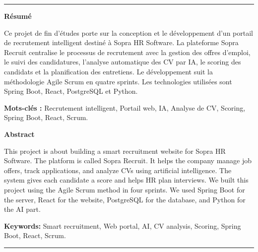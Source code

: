 ﻿\thispagestyle{empty}
\vspace*{2cm}

\begin{center}
\rule{0.8\textwidth}{0.4pt}
\vspace{0.6cm}

{\Large\bfseries Résumé}
\vspace{0.4cm}
\end{center}

\noindent Ce projet de fin d'études porte sur la conception et le développement d'un portail de recrutement intelligent destiné à Sopra HR Software. La plateforme Sopra Recruit centralise le processus de recrutement avec la gestion des offres d'emploi, le suivi des candidatures, l'analyse automatique des CV par IA, le scoring des candidats et la planification des entretiens. Le développement suit la méthodologie Agile Scrum en quatre sprints. Les technologies utilisées sont Spring Boot, React, PostgreSQL et Python.

\vspace{0.3cm}
\noindent\textbf{Mots-clés :} Recrutement intelligent, Portail web, IA, Analyse de CV, Scoring, Spring Boot, React, Scrum.

\vspace{1cm}

\begin{center}
{\Large\bfseries Abstract}
\vspace{0.4cm}
\end{center}

\noindent This project is about building a smart recruitment website for Sopra HR Software. The platform is called Sopra Recruit. It helps the company manage job offers, track applications, and analyze CVs using artificial intelligence. The system gives each candidate a score and helps HR plan interviews. We built this project using the Agile Scrum method in four sprints. We used Spring Boot for the server, React for the website, PostgreSQL for the database, and Python for the AI part.

\vspace{0.3cm}
\noindent\textbf{Keywords:} Smart recruitment, Web portal, AI, CV analysis, Scoring, Spring Boot, React, Scrum.

\vspace{0.6cm}
\begin{center}
\rule{0.8\textwidth}{0.4pt}
\end{center}

